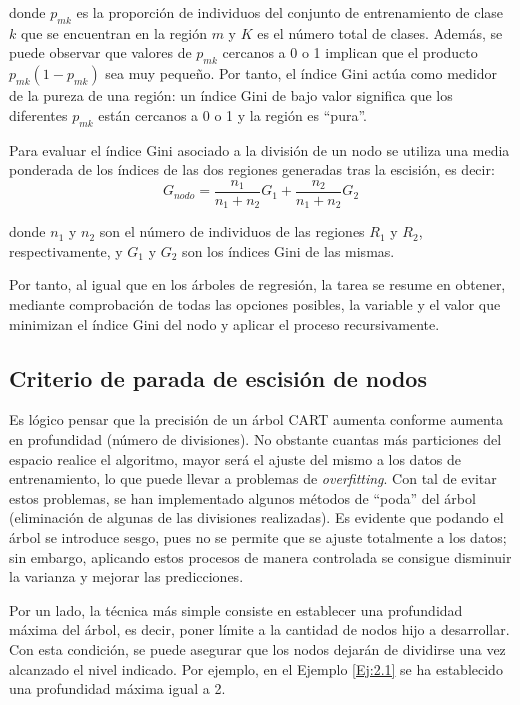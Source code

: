 \documentclass[12pt,twoside]{article}
\begin{document}
\noindent
donde $p_{mk}$ es la proporción de individuos del conjunto de entrenamiento de clase $k$ que se encuentran en la región $m$ y $K$ es el número total de clases. Además, se puede observar que valores de $p_{mk}$ cercanos a 0 o 1 implican que el producto $p_{mk}(1- p_{mk})$ sea muy pequeño. Por tanto, el índice Gini actúa como medidor de la pureza de una región: un índice Gini de bajo valor significa que los diferentes $p_{mk}$ están cercanos a 0 o 1 y la región es ``pura''.

Para evaluar el índice Gini asociado a la división de un nodo se utiliza una media ponderada de los índices de las dos regiones generadas tras la escisión, es decir:
\begin{equation*}
G_{nodo} = \frac{n_1}{n_1 + n_2}G_1 + \frac{n_2}{n_1 + n_2}G_2
\end{equation*}

\noindent
donde  $n_1$ y $n_2$ son el número de individuos de las regiones $R_1$ y $R_2$, respectivamente, y $G_1$ y $G_2$ son los índices Gini de las mismas. 

Por tanto, al igual que en los árboles de regresión, la tarea se resume en obtener, mediante comprobación de todas las opciones posibles, la variable y el valor que minimizan el índice Gini del nodo y aplicar el proceso recursivamente.




\subsection{Criterio de parada de escisión de nodos}
Es lógico pensar que la precisión de un árbol CART aumenta conforme aumenta en profundidad (número de divisiones). No obstante cuantas más particiones del espacio realice el algoritmo, mayor será el ajuste del mismo a los datos de entrenamiento, lo que puede llevar a problemas de \textit{overfitting}. Con tal de evitar estos problemas, se han implementado algunos métodos de ``poda'' del árbol (eliminación de algunas de las divisiones realizadas). Es evidente que podando el árbol se introduce sesgo, pues no se permite que se ajuste totalmente a los datos; sin embargo, aplicando estos procesos de manera controlada se consigue disminuir la varianza y mejorar las predicciones.

Por un lado, la técnica más simple consiste en establecer una profundidad máxima del árbol, es decir, poner límite a la cantidad de nodos hijo a desarrollar. Con esta condición, se puede asegurar que los nodos dejarán de dividirse una vez alcanzado el nivel indicado. Por ejemplo, en el Ejemplo \ref{Ej:2.1} se ha establecido una profundidad máxima igual a 2.
\end{document}
